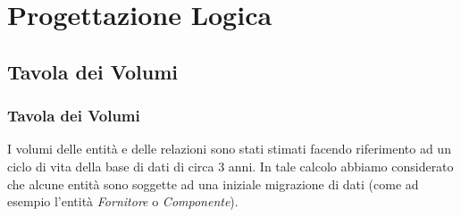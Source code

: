 \section{Progettazione Logica}
	\subsection{Tavola dei Volumi}
		\subsubsection{Tavola dei Volumi}

			I volumi delle entità e delle relazioni sono stati stimati facendo riferimento ad un ciclo di vita della base di dati di circa 3 anni. In tale calcolo abbiamo considerato che alcune entità sono soggette ad una iniziale migrazione di dati (come ad esempio l'entità \emph{Fornitore} o \emph{Componente}).
		
